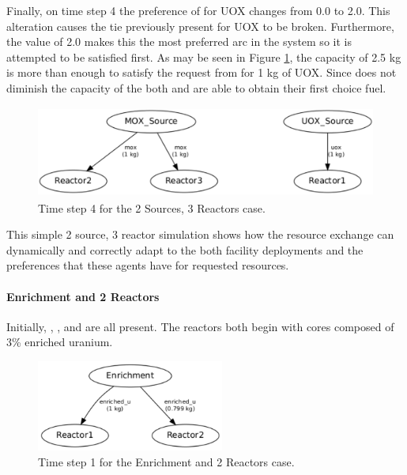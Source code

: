 Finally, on time step 4 the preference of  for UOX changes from 
0.0 to 2.0.  This alteration causes the tie previously present 
for UOX to be broken.  Furthermore, the value of 2.0 makes this the most 
preferred arc in the system so it is attempted to be satisfied first.  
As may be seen in Figure \ref{fig::2srcs3rxts-t4}, the \UOXSource{} capacity of
2.5 kg is more than enough to satisfy the request from  for 1 kg of UOX.
Since  does not diminish the capacity of the \MOXSource{} both  
and  are able to obtain their first choice fuel.

\begin{figure}
  \begin{center}
    \includegraphics[height=3cm]{./figs/2_Sources_3_Reactors-t4.pdf}
    \caption[]{\label{fig::2srcs3rxts-t4}Time step 4 for the 2 Sources, 3 Reactors 
        case.}
  \end{center}
\end{figure}

This simple 2 source, 3 reactor simulation shows how the resource 
exchange can dynamically and correctly adapt to the both facility deployments and
the preferences that these agents have for requested resources.

\paragraph{Enrichment and 2 Reactors}
\label{subsect::1enr2rxts}

Initially, \Enrichment{}, , and  are all present. The reactors both begin with cores composed of 3\% enriched uranium. 

\begin{figure}
  \begin{center}
    \includegraphics[height=3cm]{./figs/1_Enrichment_2_Reactor-t1.pdf}
    \caption[]{\label{fig::enr2rxts-t1}Time step 1 for the Enrichment and 2 Reactors 
        case.}
  \end{center}
\end{figure}

